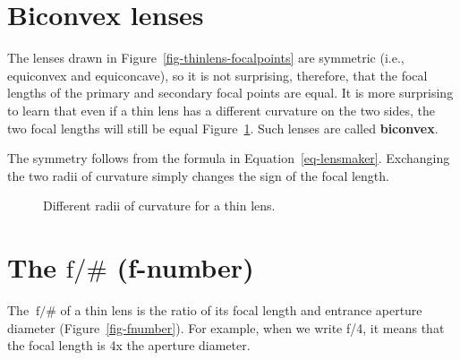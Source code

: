 \documentclass[
  letterpaper,
]{book}
\begin{document}
\section{Biconvex lenses}\label{sec-optics-biconvex}

The lenses drawn in Figure~\ref{fig-thinlens-focalpoints} are symmetric
(i.e., equiconvex and equiconcave), so it is not surprising, therefore,
that the focal lengths of the primary and secondary focal points are
equal. It is more surprising to learn that even if a thin lens has a
different curvature on the two sides, the two focal lengths will still
be equal Figure~\ref{fig-thinlens-asymmetric}. Such lenses are called
\textbf{biconvex}.

The symmetry follows from the formula in Equation~\ref{eq-lensmaker}.
Exchanging the two radii of curvature simply changes the sign of the
focal length.

\begin{figure}


\caption{\label{fig-thinlens-asymmetric}Different radii of curvature for
a thin lens.}

\end{figure}%

\section{\texorpdfstring{The \(\mathrm{f}/\#\)
(f-number)}{The \textbackslash mathrm\{f\}/\textbackslash\# (f-number)}}\label{sec-optics-fnumber}

The \(~\mathrm{f}/\#\) of a thin lens is the ratio of its focal length
and entrance aperture diameter (Figure~\ref{fig-fnumber}). For example,
when we write f/4, it means that the focal length is 4x the aperture
diameter.
\end{document}
